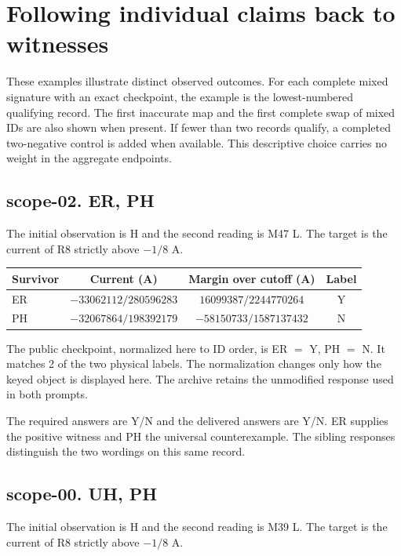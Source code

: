 \documentclass[12pt,letterpaper]{article}
\begin{document}
\section{Following individual claims back to witnesses}

These examples illustrate distinct observed outcomes. For each complete mixed signature with an exact checkpoint, the example is the lowest-numbered qualifying record. The first inaccurate map and the first complete swap of mixed IDs are also shown when present. If fewer than two records qualify, a completed two-negative control is added when available. This descriptive choice carries no weight in the aggregate endpoints.

\subsection*{scope-02. ER, PH}

The initial observation is H and the second reading is M47 L. The target is the current of R8 strictly above $-1/8$ A.

\begin{center}{\small\setlength{\tabcolsep}{4pt}\begin{tabularx}{\linewidth}{@{}Yccc@{}}\toprule
Survivor & Current (A) & Margin over cutoff (A) & Label\\\midrule
ER & $-33062112/280596283$ & $16099387/2244770264$ & Y\\
PH & $-32067864/198392179$ & $-58150733/1587137432$ & N\\
\bottomrule\end{tabularx}}\end{center}

The public checkpoint, normalized here to ID order, is ER $=$ Y, PH $=$ N. It matches 2 of the two physical labels. The normalization changes only how the keyed object is displayed here. The archive retains the unmodified response used in both prompts.

The required answers are Y/N and the delivered answers are Y/N. ER supplies the positive witness and PH the universal counterexample. The sibling responses distinguish the two wordings on this same record.

\subsection*{scope-00. UH, PH}

The initial observation is H and the second reading is M39 L. The target is the current of R8 strictly above $-1/8$ A.
\end{document}
